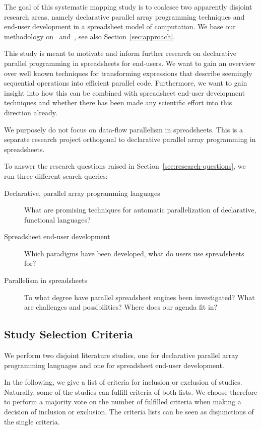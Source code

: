 \documentclass[a4paper]{article}
\begin{document}
The goal of this systematic mapping study is to coalesce two apparently disjoint research areas, namely declarative parallel array programming techniques and end-user development in a spreadsheet model of computation. We base our methodology on~\citet{keele2007guidelines}
and~\citet{petersen2008systematic}, see also Section~\ref{sec:approach}.

This study is meant to motivate and inform further research on declarative parallel programming in spreadsheets for end-users. We want to gain an overview over well known techniques for transforming expressions that describe seemingly sequential operations into efficient parallel code. Furthermore, we want to gain insight into how this can be combined with spreadsheet end-user development techniques and whether there has been made any scientific effort into this direction already.

We purposely do not focus on data-flow parallelism in spreadsheets. This is a separate research project orthogonal to declarative parallel array programming in spreadsheets.

To answer the research questions raised in Section~\ref{sec:research-questions}, we run three different search queries:

\begin{description}
\item[Declarative, parallel array programming languages] What are
  promising techniques for automatic parallelization of declarative,
  functional languages?
\item[Spreadsheet end-user development] Which paradigms have been
  developed, what do users use spreadsheets for?
\item[Parallelism in spreadsheets] To what degree have parallel
  spreadsheet engines been investigated? What are challenges and
  possibilities? Where does our agenda fit in?
\end{description}

\subsection{Study Selection Criteria}
\label{sec:study-select-crit}

We perform two disjoint literature studies, one for declarative parallel array programming languages and one for spreadsheet end-user development.

In the following, we give a list of criteria for inclusion or exclusion of studies. Naturally, some of the studies can fulfill criteria of both lists. We choose therefore to perform a majority vote on the number of fulfilled criteria when making a decision of inclusion or exclusion. The criteria lists can be seen as disjunctions of the single criteria.
\end{document}
